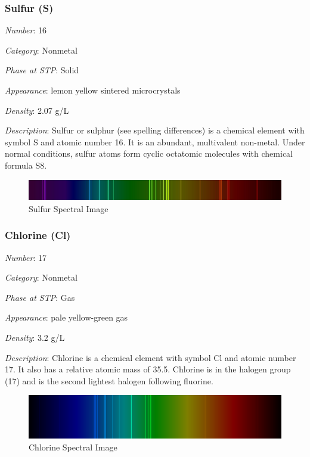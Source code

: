 \documentclass{article}
\begin{document}
\hypertarget{subsubsection::S}{}\subsubsection{Sulfur (S)}

\textit{Number}: 16

\textit{Category}: Nonmetal

\textit{Phase at STP}: Solid

\textit{Appearance}: lemon yellow sintered microcrystals

\textit{Density}: 2.07 g/L

\textit{Description}: Sulfur or sulphur (see spelling differences) is a chemical element with symbol S and atomic number 16. It is an abundant, multivalent non-metal. Under normal conditions, sulfur atoms form cyclic octatomic molecules with chemical formula S8.

\immediate{}
\begin{figure}[!ht]
    \centering
    \includegraphics[width=12cm]{./resources/spectral_img/Sulfur_Spectrum.jpg}
    \caption{Sulfur Spectral Image}
\end{figure}

\hypertarget{subsubsection::Cl}{}\subsubsection{Chlorine (Cl)}

\textit{Number}: 17

\textit{Category}: Nonmetal

\textit{Phase at STP}: Gas

\textit{Appearance}: pale yellow-green gas

\textit{Density}: 3.2 g/L

\textit{Description}: Chlorine is a chemical element with symbol Cl and atomic number 17. It also has a relative atomic mass of 35.5. Chlorine is in the halogen group (17) and is the second lightest halogen following fluorine.

\immediate{}
\begin{figure}[!ht]
    \centering
    \includegraphics[width=12cm]{./resources/spectral_img/Chlorine_spectrum_visible.png}
    \caption{Chlorine Spectral Image}
\end{figure}
\end{document}
